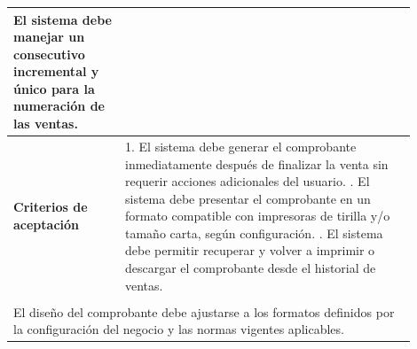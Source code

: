 \begin{longtable}{|p{0.25\linewidth}|p{0.15\linewidth}|p{0.15\linewidth}|p{0.35\linewidth}|}
{		El sistema debe manejar un consecutivo incremental y único para la numeración de las ventas.}                                                                                                     \\ \hline
		\cellcolor{tableheaderblue}\textbf{Criterios de aceptación} & \multicolumn{3}{p{0.70\linewidth}|}{                                                                                                %
			1. El sistema debe generar el comprobante inmediatamente después de finalizar la venta sin requerir acciones adicionales del usuario. \newline
			2. El sistema debe presentar el comprobante en un formato compatible con impresoras de tirilla y/o tamaño carta, según configuración. \newline
		3. El sistema debe permitir recuperar y volver a imprimir o descargar el comprobante desde el historial de ventas.}                                                                               \\ \hline
		\rowcolor{tableheaderblue}
		\multicolumn{4}{|l|}{\textbf{Restricciones}}                                                                                                                                                      \\ \hline
		\multicolumn{4}{|p{0.96\linewidth}|}{%
		El diseño del comprobante debe ajustarse a los formatos definidos por la configuración del negocio y las normas vigentes aplicables.}                                                             \\ \hline
	
\end{longtable}
\endgroup


